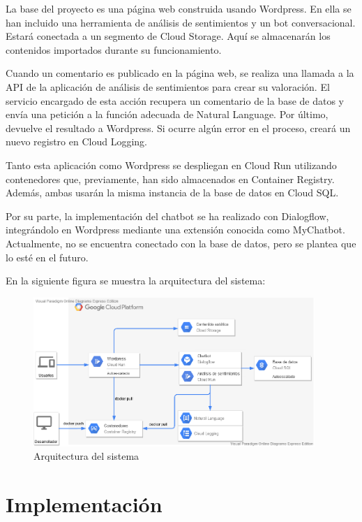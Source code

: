 \newpage

La base del proyecto es una página web construida usando Wordpress. En ella se han incluido una herramienta de análisis de sentimientos y un bot conversacional. Estará conectada a un segmento de Cloud Storage. Aquí se almacenarán los contenidos importados durante su funcionamiento. 

Cuando un comentario es publicado en la página web, se realiza una llamada a la API de la aplicación de análisis de sentimientos para crear su valoración. El servicio encargado de esta acción recupera un comentario de la base de datos y envía una petición a la función adecuada de Natural Language. Por último, devuelve el resultado a Wordpress. Si ocurre algún error en el proceso, creará un nuevo registro en Cloud Logging.

Tanto esta aplicación como Wordpress se despliegan en Cloud Run utilizando contenedores que, previamente, han sido almacenados en Container Registry. Además, ambas usarán la misma instancia de la base de datos en Cloud SQL. 

Por su parte, la implementación del chatbot se ha realizado con Dialogflow, integrándolo en Wordpress mediante una extensión conocida como MyChatbot. Actualmente, no se encuentra conectado con la base de datos, pero se plantea que lo esté en el futuro.

En la siguiente figura se muestra la arquitectura del sistema:

\begin{figure}[ht]
	\begin{center}
		\includegraphics[width = 0.95\textwidth]{Figuras/ArquitecturaV3.png}
	\end{center}
	\caption{\label{fig:systemArchitecture} Arquitectura del sistema}
\end{figure}

\newpage
\section{Implementación}


